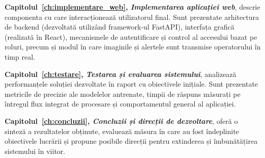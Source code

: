 \documentclass[../../main.tex]{subfiles}
\begin{document}
\textbf{Capitolul~\ref{ch:implementare_web}, \emph{Implementarea aplicației web}}, descrie componenta cu care interacționează utilizatorul final. Sunt prezentate arhitectura de backend (dezvoltată utilizând framework-ul FastAPI), interfața grafică (realizată în React), mecanismele de autentificare și control al accesului bazat pe roluri, precum și modul în care imaginile și alertele sunt transmise operatorului în timp real.

\textbf{Capitolul~\ref{ch:testare}, \emph{Testarea și evaluarea sistemului}}, analizează performanțele soluției dezvoltate în raport cu obiectivele inițiale. Sunt prezentate metricile de precizie ale modelelor antrenate, timpii de răspuns măsurați pe întregul flux integrat de procesare și comportamentul general al aplicației.

\textbf{Capitolul~\ref{ch:concluzii}, \emph{Concluzii și direcții de dezvoltare}}, oferă o sinteză a rezultatelor obținute, evaluează măsura în care au fost îndeplinite obiectivele lucrării și propune posibile direcții pentru extinderea și îmbunătățirea sistemului în viitor.
\end{document}

